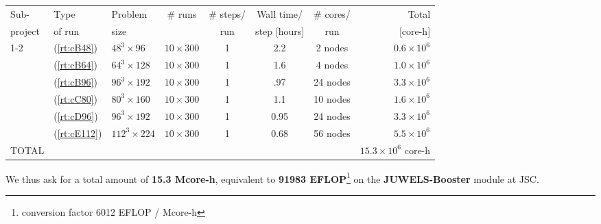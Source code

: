 \begin{center}
	{\small
		\begin{tabular}{lllccccr} \hline\hline
			Sub-         &
			Type         &
			Problem      &
			\# runs      &
			\# steps/    &
			Wall time/   &
			\# cores/    &
			Total                                                                                                               \\
			project      &
			of run       &
			size         &
			             &
			run          &
			step [hours] &
			run          &
			[core-h]                                                                                                            \\
			\hline\hline
			1-2          & (\ref{rt:cB48})  & $48^3\times 96$  & $10\times 300$ & 1 & 2.2  & 2 nodes  & $0.6 \times 10^6$      \\
			             & (\ref{rt:cB64})  & $64^3\times 128$  & $10\times 300$ & 1 & 1.6 & 4 nodes  & $1.0 \times 10^6$      \\
			             & (\ref{rt:cB96})  & $96^3\times 192$  & $10\times 300$ & 1 & .97 & 24 nodes & $3.3 \times 10^6$      \\
			             & (\ref{rt:cC80})  & $80^3\times 160$  & $10\times 300$ & 1 & 1.1 & 10 nodes & $1.6 \times 10^6$      \\
			             & (\ref{rt:cD96})  & $96^3\times 192$  & $10\times 300$ & 1 & 0.95 & 24 nodes & $3.3 \times 10^6$      \\
			             & (\ref{rt:cE112}) & $112^3\times 224$ & $10\times 300$ & 1 & 0.68 & 56 nodes & $5.5 \times 10^6$      \\
			\hline\hline
			TOTAL        &                  &                   &                &   &      &          & $15.3\times 10^6$ core-h \\
		\end{tabular}
	}
\end{center}
\bigskip
We thus ask for a total amount of \textbf{15.3 Mcore-h}, equivalent to \textbf{91983 EFLOP}\footnote{conversion factor 6012 EFLOP / Mcore-h}  on the \textbf{JUWELS-Booster} module at JSC.

